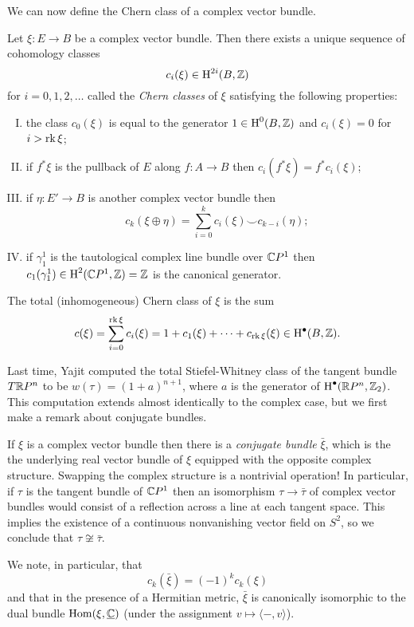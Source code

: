 \documentclass{amsart}
\begin{document}
We can now define the Chern class of a complex vector bundle.
\begin{theorem}
    Let $\xi:E\to B$ be a complex vector bundle. Then there exists a unique sequence of cohomology classes
    \begin{equation*}
        c_i(\xi) \in \operatorname{H}^{2i}(B, \mathbb{Z})
    \end{equation*}
    for $i=0,1,2,\ldots$ called the \textit{Chern classes} of $\xi$ satisfying the following
    properties:
    \begin{enumerate}[(I)]
        \item the class $c_0(\xi)$ is equal to the generator $1\in\operatorname{H}^0(B,\mathbb{Z})$ and $c_i(\xi)=0$ for $i>\operatorname{rk}\xi$;
        \item if $f^*\xi$ is the pullback of $E$ along $f:A\to B$ then $c_i(f^*\xi)=f^*c_i(\xi)$;
        \item if $\eta:E'\to B$ is another complex vector bundle then
            \begin{equation*}
                c_k(\xi\oplus \eta) = \sum_{i=0}^k c_i(\xi)\smile c_{k-i}(\eta);
            \end{equation*}
        \item if $\gamma_1^1$ is the tautological complex line bundle over $\mathbb{C} P^1$ then $c_1(\gamma_1^1)\in\operatorname{H}^2(\mathbb{C} P^1,\mathbb{Z})=\mathbb{Z}$
            is the canonical generator.
    \end{enumerate}
    The total (inhomogeneous) Chern class of $\xi$ is the sum
    \begin{equation*}
        c(\xi) = \sum_{i=0}^{\operatorname{rk}\xi}c_i(\xi) = 1 + c_1(\xi) + \cdots + c_{\operatorname{rk}\xi}(\xi)\in\operatorname{H}^\bullet(B,\mathbb{Z}).
    \end{equation*}
    \label{sw}
\end{theorem}

Last time, Yajit computed the total Stiefel-Whitney class of the tangent bundle $T\mathbb{R} P^n$ to be
$w(\tau) = (1+a)^{n+1}$, where $a$ is the generator of $\operatorname{H}^\bullet(\mathbb{R} P^n,\mathbb{Z}_2)$.
This computation extends almost identically to the complex case, but we first make a remark
about conjugate bundles.
\begin{remark}
    If $\xi$ is a complex vector bundle then there is a \textit{conjugate bundle}
    $\bar\xi$, which is the the underlying real vector bundle of $\xi$ equipped with the opposite
    complex structure. Swapping the complex structure is a nontrivial operation! In particular,
    if $\tau$ is the tangent bundle of $\mathbb{C} P^1$ then an isomorphism $\tau\to\bar\tau$ of complex
    vector bundles would consist of a reflection across a line at each tangent space. This implies
    the existence of a continuous nonvanishing vector field on $S^2$, so we conclude that
    $\tau\not\cong\bar\tau$.

    We note, in particular, that
    \begin{equation*}
        c_k(\bar\xi) = (-1)^k c_k(\xi)
    \end{equation*}
    and that in the presence of a Hermitian metric, $\bar\xi$ is canonically isomorphic to the
    dual bundle $\operatorname{Hom}(\xi,\underline{\mathbb{C}})$ (under the assignment $v\mapsto \langle -,v\rangle$).
\end{remark}
\end{document}
